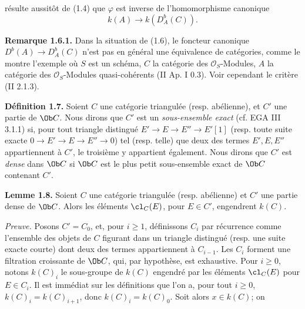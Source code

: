 résulte aussitôt de (1.4) que \(\varphi\) est inverse de l'homomorphisme canonique
\[
 k(A)\longrightarrow k(D_A^b(C)).
\]

\textbf{Remarque 1.6.1.} Dans la situation de (1.6), le foncteur canonique \(D^b(A)\longrightarrow D_A^b(C)\) n'est pas en général une équivalence de catégories, comme le montre l'exemple où \(S\) est un schéma, \(C\) la catégorie des \(\mathcal O_S\)-Modules, \(A\) la catégorie des \(\mathcal O_S\)-Modules quasi-cohérents (II Ap. I 0.3). Voir cependant le critère (II 2.1.3).

\textbf{Définition 1.7.} Soient \(C\) une catégorie triangulée (resp. abélienne), et \(C'\) une partie de \(\Ob C\). Nous dirons que \(C'\) est un \emph{sous-ensemble exact} (cf. EGA III 3.1.1) si, pour tout triangle distingué \(E'\to E\to E''\to E'[1]\) (resp. toute suite exacte \(0\to E'\to E\to E''\to0\)) tel (resp. telle) que deux des termes \(E',E,E''\) appartiennent à \(C'\), le troisième y appartient également. Nous dirons que \(C'\) est \emph{dense} dans \(\Ob C\) si \(\Ob C\) est le plus petit sous-ensemble exact de \(\Ob C\) contenant \(C'\).

\textbf{Lemme 1.8.} Soient \(C\) une catégorie triangulée (resp. abélienne) et \(C'\) une partie dense de \(\Ob C\). Alors les éléments \(\cl_C(E)\), pour \(E\in C'\), engendrent \(k(C)\).

\emph{Preuve.} Posons \(C'=C_0\), et, pour \(i\geq1\), définissons \(C_i\) par récurrence comme l'ensemble des objets de \(C\) figurant dans un triangle distingué (resp. une suite exacte courte) dont deux des termes appartiennent à \(C_{i-1}\). Les \(C_i\) forment une filtration croissante de \(\Ob C\), qui, par hypothèse, est exhaustive. Pour \(i\geq0\), notons \(k(C)_i\) le sous-groupe de \(k(C)\) engendré par les éléments \(\cl_C(E)\) pour \(E\in C_i\). Il est immédiat sur les définitions que l'on a, pour tout \(i\geq0\), \(k(C)_i=k(C)_{i+1}\), donc \(k(C)_i=k(C)_0\). Soit alors \(x\in k(C)\); on
